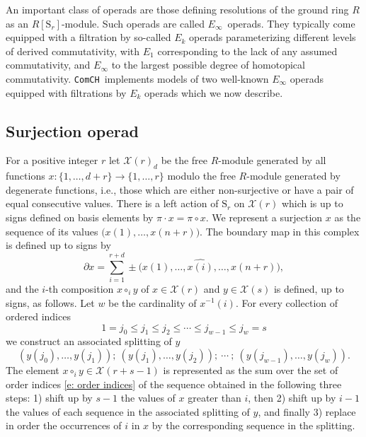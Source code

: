 \documentclass{amsart}
\renewcommand{\S}{\mathrm{S}}
\newcommand{\comch}{\texttt{ComCH}}
\newcommand{\X}{\mathcal X}
\begin{document}
An important class of operads are those defining resolutions of the ground ring $R$ as an $R[\S_r]$-module.
Such operads are called \mbox{$E_\infty$ operads}.
They typically come equipped with a filtration by so-called $E_k$ operads parameterizing different levels of derived commutativity, with $E_1$ corresponding to the lack of any assumed commutativity, and $E_\infty$ to the largest possible degree of homotopical commutativity.
\comch\, implements models of two well-known $E_\infty$ operads equipped with filtrations by $E_k$ operads which we now describe.

\subsection{Surjection operad}

For a positive integer $r$ let $\mathcal X(r)_d$ be the free $R$-module generated by all functions $x : \{1, \dots, d+r\} \to \{1, \dots, r\}$ modulo the free $R$-module generated by degenerate functions, i.e., those which are either non-surjective or have a pair of equal consecutive values.
There is a left action of $\S_r$ on $\mathcal X(r)$ which is up to signs defined on basis elements by $\pi \cdot x = \pi \circ x$.
We represent a surjection $x$ as the sequence of its values $\big( x(1), \dots, x(n+r) \big)$.
The boundary map in this complex is defined up to signs by
\begin{equation*}
\partial x = \sum_{i = 1}^{r+d} \pm \big( x(1), \dots, \widehat{x(i)}, \dots, x(n+r) \big),
\end{equation*}
and the $i$-th composition $x \circ_i y$ of $x \in \mathcal X(r)$ and $y \in \mathcal X(s)$ is defined, up to signs, as follows.
Let $w$ be the cardinality of $x^{-1}(i)$.
For every collection of ordered indices
\begin{equation} \label{e: order indices}
1 = j_0 \leq j_1 \leq j_2 \leq \cdots \leq j_{w-1} \leq j_w = s
\end{equation}
we construct an associated splitting of $y$
\begin{equation*}
(y(j_0), \dots, y(j_1));\ (y(j_1), \dots, y(j_2));\ \cdots \ ;\ (y(j_{w-1}), \dots, y(j_w)).
\end{equation*}
The element $x \circ_i y \in \X(r+s-1)$ is represented as the sum over the set of order indices \eqref{e: order indices} of the sequence obtained in the following three steps: 1) shift up by $s-1$ the values of $x$ greater than $i$, then 2) shift up by $i-1$ the values of each sequence in the associated splitting of $y$, and finally 3) replace in order the occurrences of $i$ in $x$ by the corresponding sequence in the splitting.
\end{document}
